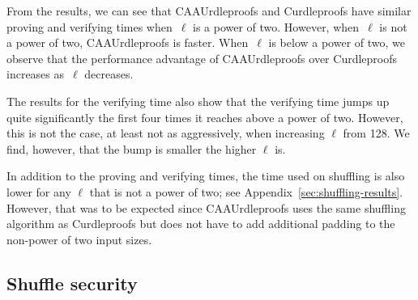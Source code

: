 From the results, we can see that CAAUrdleproofs and Curdleproofs have similar proving and verifying times when~$\ell$ is a power of two.
However, when~$\ell$ is not a power of two, CAAUrdleproofs is faster.
When~$\ell$ is below a power of two, we observe that the performance advantage of CAAUrdleproofs over Curdleproofs increases as~$\ell$ decreases.

The results for the verifying time also show that the verifying time jumps up quite significantly the first four times it reaches above a power of two.
However, this is not the case, at least not as aggressively, when increasing $\ell$ from 128.
We find, however, that the bump is smaller the higher $\ell$ is.

In addition to the proving and verifying times, the time used on shuffling is also lower for any $\ell$ that is not a power of two; see Appendix~\ref{sec:shuffling-results}.
However, that was to be expected since CAAUrdleproofs uses the same shuffling algorithm as Curdleproofs but does not have to add additional padding to the non-power of two input sizes.



\subsection{Shuffle security}\label{subsec:Shuffle-security}

